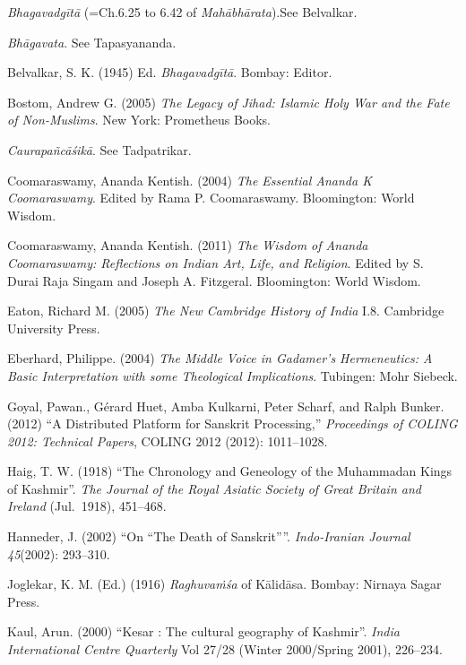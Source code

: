\begin{thebibliography}{99}
\itemsep=2pt
{\sl Bhagavadgītā} (=Ch.6.25 to 6.42 of {\sl Mahābhārata}).See Belvalkar.

{\sl Bhāgavata}. See Tapasyananda.

Belvalkar, S. K. (1945) Ed. {\sl Bhagavadgītā}. Bombay: Editor.

Bostom, Andrew G. (2005) {\sl The Legacy of Jihad: Islamic Holy War and the Fate of Non-Muslims}. New York: Prometheus Books.

{\sl Caurapañcāśikā}. See Tadpatrikar.

Coomaraswamy, Ananda Kentish. (2004) {\sl The Essential Ananda K Coomaraswamy}. Edited by Rama P. Coomaraswamy. Bloomington: World Wisdom.

Coomaraswamy, Ananda Kentish. (2011) {\sl The Wisdom of Ananda Coomaraswamy: Reflections on Indian Art, Life, and Religion}. Edited by S. Durai Raja Singam and Joseph A. Fitzgeral. Bloomington: World Wisdom.

Eaton, Richard M. (2005) {\sl The New Cambridge History of India} I.8. Cambridge University Press.

Eberhard, Philippe. (2004) {\sl The Middle Voice in Gadamer’s Hermeneutics: A Basic Interpretation with some Theological Implications}. Tubingen: Mohr Siebeck. 

Goyal, Pawan., Gérard Huet, Amba Kulkarni, Peter Scharf, and Ralph Bunker. (2012) “A Distributed Platform for Sanskrit Processing,” {\sl Proceedings of COLING 2012: Technical Papers}, COLING 2012 (2012): 1011--1028.

Haig, T. W. (1918) “The Chronology and Geneology of the Muhammadan Kings of Kashmir”.  {\sl The Journal of the Royal Asiatic Society of Great Britain and Ireland} (Jul.~1918), 451--468.

Hanneder, J. (2002) “On “The Death of Sanskrit””. {\sl Indo-Iranian Journal 45}(2002): 293--310.

Joglekar, K. M. (Ed.) (1916) {\sl Raghuvaṁśa} of Kālidāsa. Bombay: Nirnaya Sagar Press.

Kaul, Arun. (2000) “Kesar : The cultural geography of Kashmir”. {\sl India International Centre Quarterly} Vol 27/28 (Winter 2000/Spring 2001), 226--234.


\end{thebibliography}

